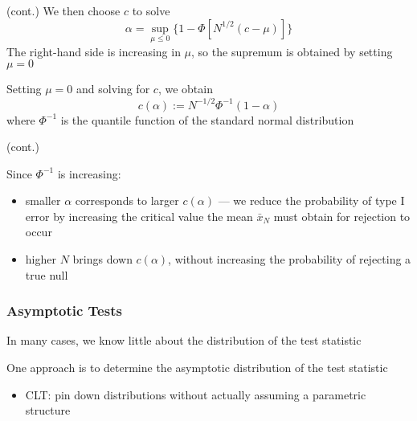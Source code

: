 \begin{frame}
    
    \vspace{2em}
    \Eg (cont.)
    We then choose $c$ to solve 
    \begin{equation*}
        \alpha = \sup_{\mu \leq 0} \{ 1 - \Phi[N^{1/2}(c - \mu)] \}
    \end{equation*}
    The right-hand side is increasing in $\mu$, so the supremum is obtained
    by setting $\mu = 0$
    
    Setting $\mu = 0$ and solving for $c$, we
    obtain
    \begin{equation*}
        c(\alpha) := N^{-1/2} \Phi^{-1} (1 - \alpha)
    \end{equation*}
    where $\Phi^{-1}$ is the quantile function of the standard normal
    distribution

\end{frame}

\begin{frame}

    \vspace{2em}
    \Eg (cont.) 
    
    Since $\Phi^{-1}$ is increasing:
    \begin{itemize}
        \item smaller $\alpha$ corresponds to
                larger $c(\alpha)$ --- we reduce the probability of type I error by
                increasing the critical value the mean $\bar{x}_N$ must obtain for
                rejection to occur
        \item higher $N$ brings down $c(\alpha)$, without increasing the probability
                of rejecting a true null
    \end{itemize}
    
\end{frame}

\begin{frame}\frametitle{Asymptotic Tests}

    \vspace{2em}
    In many cases, we know little about the distribution of the test
    statistic
    
     One approach is to determine the asymptotic distribution of the test statistic
     \begin{itemize}
         \item CLT: pin down distributions without actually assuming a
                parametric structure
     \end{itemize}
     
\end{frame}

